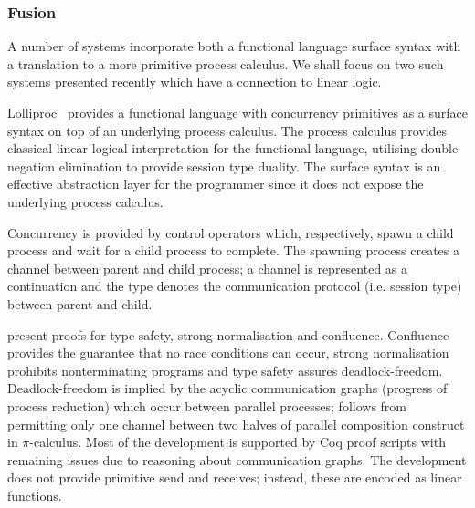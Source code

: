 \documentclass{mprop}
\begin{document}
\subsubsection{Fusion}

A number of systems incorporate both a functional language surface syntax with a translation to a more primitive process calculus. We shall focus on two such systems presented recently which have a connection to linear logic.

Lolliproc~\cite{Mazurak:2010:LCC} provides a functional language with concurrency primitives as a surface syntax on top of an underlying process calculus. The process calculus provides classical linear logical interpretation for the functional language, utilising double negation elimination to provide session type duality. The surface syntax is an effective abstraction layer for the programmer since it does not expose the underlying process calculus.

Concurrency is provided by control operators which, respectively, spawn a child process and wait for a child process to complete. The spawning process creates a channel between parent and child process; a channel is represented as a continuation and the type denotes the communication protocol (i.e. session type) between parent and child.

\citeauthor{Mazurak:2010:LCC} present proofs for type safety, strong normalisation and confluence. Confluence provides the guarantee that no race conditions can occur, strong normalisation prohibits nonterminating programs and type safety assures deadlock-freedom. Deadlock-freedom is implied by the acyclic communication graphs (progress of process reduction) which occur between parallel processes; follows from permitting only one channel between two halves of parallel composition construct in $\pi$-calculus. Most of the development is supported by Coq proof scripts with remaining issues due to reasoning about communication graphs. The development does not provide primitive send and receives; instead, these are encoded as linear functions. 
\end{document}
